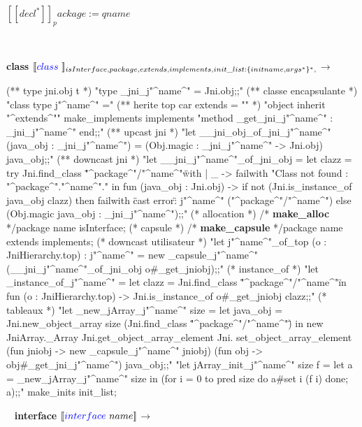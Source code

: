\documentclass[a4paper, 11pt]{report}
\newcommand{\fun}[1]{\ttfamily\textbf{#1}}
\begin{document}
$[\![ decl^* ]\!]_package:=qname$ 

\ 
\newline

\textbf{class}
\newline
\noindent
$[\![ {\color{blue}class}\ ]\!]_{isInterface, package, extends, implements, init\_list:\{initname, args^*\}^*, }$$\longrightarrow$
\begin{OCaml}
(** type jni.obj t *)
"type _jni_j"^name^" = Jni.obj;;"
(** classe encapsulante *)
"class type j"^name^" ="
(** herite top car extends = "" *)
   "object inherit "^extends^""
    make_implements implements
   "method _get_jni_j"^name^" : _jni_j"^name^"
   end;;"
(** upcast jni *)
"let __jni_obj_of_jni_j"^name^" (java_obj : _jni_j"^name^") =
   (Obj.magic : _jni_j"^name^" -> Jni.obj) java_obj;;"
(** downcast jni *)
"let __jni_j"^name^"_of_jni_obj =
   let clazz =
      try Jni.find_class \""^package^"/"^name^"\"
   with | _ -> failwith "Class not found : "^package^"."^name^"."
   in
      fun (java_obj : Jni.obj) ->
        if not (Jni.is_instance_of java_obj clazz)
        then failwith \"cast error\" : j"^name^" ("^package^"/"^name^")
        else (Obj.magic java_obj : _jni_j"^name^");;"
(* allocation *)
/* \fun{make\_alloc} */package name isInterface;
(* capsule *)
/* \fun{make\_capsule} */package name extends implements;
(* downcast utilisateur *)
"let j"^name^"_of_top (o : JniHierarchy.top) : j"^name^" =
    new _capsule_j"^name^" (__jni_j"^name^"_of_jni_obj o#_get_jniobj);;"
(* instance_of *)
"let _instance_of_j"^name^" =
   let clazz = Jni.find_class \""^package^"/"^name^"\"
    in fun (o : JniHierarchy.top) -> Jni.is_instance_of o#_get_jniobj clazz;;"
(* tableaux *)
"let _new_jArray_j"^name^" size =
    let java_obj = Jni.new_object_array size (Jni.find_class \""^package^"/"^name^"\")
    in
      new JniArray._Array Jni.get_object_array_element Jni.
        set_object_array_element (fun jniobj -> new _capsule_j"^name^" jniobj)
        (fun obj -> obj#_get_jni_j"^name^") java_obj;;"
"let jArray_init_j"^name^" size f =
    let a = _new_jArray_j"^name^" size
    in (for i = 0 to pred size do a#set i (f i) done; a);;"
make_inits init_list;
\end{OCaml}

\newpage
\
\newline
\textbf{ interface }
\newline
\noindent
$[\![{\color{blue}interface}\  name ]\!]$$\longrightarrow$
% 
\end{document}
